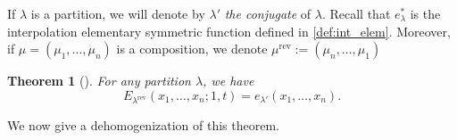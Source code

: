\documentclass[12pt]{amsart}
\newtheorem{thm}{Theorem}[section]
\theoremstyle{definition}
\DeclareMathOperator{\rev}{rev}
\newcommand{\Estar}[2]{{E^{*#1}_{#2}}}
\def\LW#1{(\textcolor{teal}{LW:#1})}
\def\HBD#1{(\textcolor{violet}{HBD:#1})}
\begin{document}
\begin{appendices}
If $\lambda$ is a partition, we will denote by $\lambda'$ \textit{the conjugate} of $\lambda$.
Recall that $e_{\lambda}^*$ is the interpolation elementary symmetric function defined in \cref{def:int_elem}. Moreover, if $\mu=(\mu_1,\dots,\mu_n)$ is a composition, we denote $\mu^{\rev}:=(\mu_n,\dots,\mu_1)$


\begin{thm}[{\cite[Theorem 18]{AlexanderssonSawhney2019}}]
\label{thm:E_partition_hom}
    For any partition $\lambda$, we have
    $$E^{}_{\lambda^{\rev}}(x_1,\dots,x_n;1,t)=e_{\lambda'}(x_1,\dots,x_n).$$
\end{thm}

We now give  a dehomogenization of this theorem.


\end{appendices}
\end{document}
